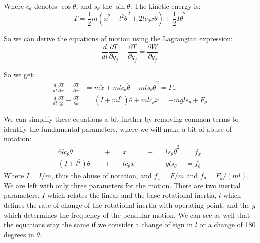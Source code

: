 Where $c_\theta$ denotes $\cos \theta$, and $s_\theta$ the $\sin \theta$. The kinetic energy is:
\begin{equation}
	T = \frac{1}{2} m \left(\dot{x}^2 + l^2 \dot{\theta}^2 + 2 l c_\theta  \dot{x} \dot{\theta} \right) + \frac{1}{2}I\dot{\theta}^2
\end{equation}

So we can derive the equations of motion using the Lagrangian expression:
\begin{equation}
	\frac{d}{dt}\frac{\partial T}{\partial \dot{q}_j}-\frac{\partial T}{\partial q_j} = \frac{\partial W}{\partial q_j}
\end{equation}

So we get:
\begin{align}
	\frac{d}{dt}\frac{\partial T}{\partial \dot{x}}-\frac{\partial T}{\partial x} &=
	m \ddot{x} + m l c_\theta \ddot{\theta} - m l s_\theta \dot{\theta}^2 = F_x \\
	\frac{d}{dt}\frac{\partial T}{\partial \dot{\theta}}-\frac{\partial T}{\partial \theta} &=
	\left(I+m l^2\right) \ddot{\theta} + m l c_\theta \ddot{x} = - m g l s_\theta + F_\theta
\end{align}

We can simplify these equations a bit further by removing common terms to identify the fundamental parameters, where we will make a bit of abuse of notation:
\begin{alignat}{6}
	l c_\theta \ddot{\theta} 	&& \ + \ && \ddot{x}  		 && \ - \ && l s_\theta \dot{\theta}^2 &= f_x \\
	(I+l^2) \ddot{\theta} \		&& \ + \ && l c_\theta \ddot{x} && \ + \ && g l s_\theta                 &= f_\theta
\end{alignat}
Where $I=I/m$, thus the abuse of notation, and $f_x=F/m$ and $f_\theta=F_\theta/(ml)$. We are left with only three parameters for the motion. There are two inertial parameters, $I$ which relates the linear and the base rotational inertia, $l$ which defines the rate of change of the rotational inertia with operating point, and the $g$ which determines the frequency of the pendular motion. 
We can see as well that the equations stay the same if we consider a change of sign in $l$ or a change of 180 degrees in $\theta$.

